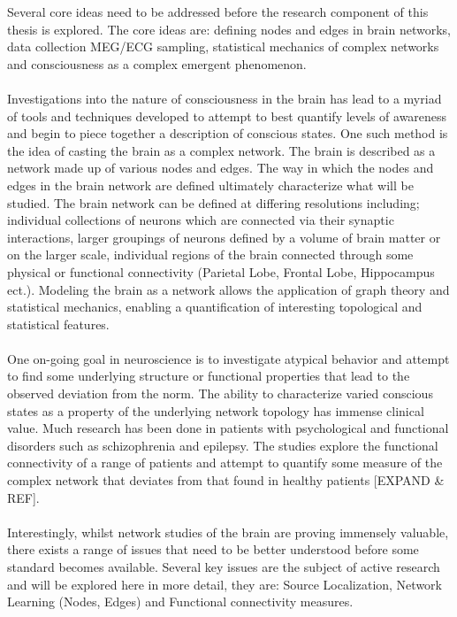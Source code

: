 \documentclass{article}
\begin{document}
Several core ideas need to be addressed before the research component of this thesis is explored. The core ideas are: defining nodes and edges in brain networks, data collection MEG/ECG sampling, statistical mechanics of complex networks and consciousness as a complex emergent phenomenon.\\
\\
Investigations into the nature of consciousness in the brain has lead to a myriad of tools and techniques developed to attempt to best quantify levels of awareness and begin to piece together a description of conscious states. One such method is the idea of casting the brain as a complex network. The brain is described as a network made up of various nodes and edges. The way in which the nodes and edges in the brain network are defined ultimately characterize what will be studied. The brain network can be defined at differing resolutions including; individual collections of neurons which are connected via their synaptic interactions, larger groupings of neurons defined by a volume of brain matter or on the larger scale, individual regions of the brain connected through some physical or functional connectivity (Parietal Lobe, Frontal Lobe, Hippocampus ect.). Modeling the brain as a network allows the application of graph theory and statistical mechanics, enabling  a quantification of interesting topological and statistical features.\\
\\
One on-going goal in neuroscience is to investigate atypical behavior and attempt to find some underlying structure or functional properties that lead to the observed deviation from the norm. The ability to characterize varied conscious states as a property of the underlying network topology has immense clinical value. Much research has been done in patients with psychological and functional disorders such as schizophrenia and epilepsy. The studies explore the functional connectivity of a range of patients and attempt to quantify  some measure of the complex network that deviates from that found in healthy patients [EXPAND \& REF].\\
\\
Interestingly, whilst network studies of the brain are proving immensely valuable, there exists a range of issues that need to be better understood before some standard becomes available. Several key issues are the subject of active research and will be explored here in more detail, they are: Source Localization, Network Learning (Nodes, Edges) and Functional connectivity measures. 
\end{document}
